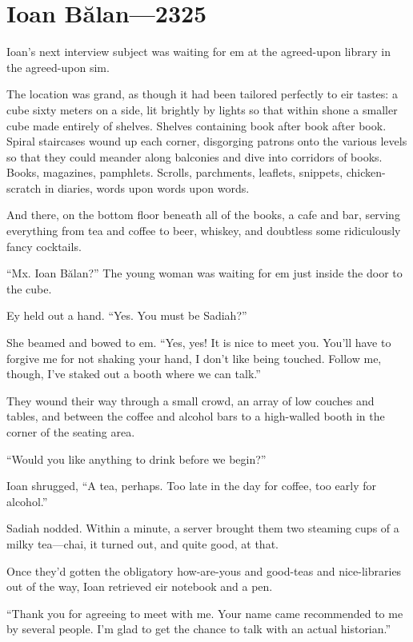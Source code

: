 \hypertarget{ioan-bux103lan-2325}{%
\chapter{Ioan Bălan---2325}\label{ioan-bux103lan-2325}}

Ioan's next interview subject was waiting for em at the agreed-upon library in the agreed-upon sim.

The location was grand, as though it had been tailored perfectly to eir tastes: a cube sixty meters on a side, lit brightly by lights so that within shone a smaller cube made entirely of shelves. Shelves containing book after book after book. Spiral staircases wound up each corner, disgorging patrons onto the various levels so that they could meander along balconies and dive into corridors of books. Books, magazines, pamphlets. Scrolls, parchments, leaflets, snippets, chicken-scratch in diaries, words upon words upon words.

And there, on the bottom floor beneath all of the books, a cafe and bar, serving everything from tea and coffee to beer, whiskey, and doubtless some ridiculously fancy cocktails.

``Mx. Ioan Bălan?'' The young woman was waiting for em just inside the door to the cube.

Ey held out a hand. ``Yes. You must be Sadiah?''

She beamed and bowed to em. ``Yes, yes! It is nice to meet you. You'll have to forgive me for not shaking your hand, I don't like being touched. Follow me, though, I've staked out a booth where we can talk.''

They wound their way through a small crowd, an array of low couches and tables, and between the coffee and alcohol bars to a high-walled booth in the corner of the seating area.

``Would you like anything to drink before we begin?''

Ioan shrugged, ``A tea, perhaps. Too late in the day for coffee, too early for alcohol.''

Sadiah nodded. Within a minute, a server brought them two steaming cups of a milky tea---chai, it turned out, and quite good, at that.

Once they'd gotten the obligatory how-are-yous and good-teas and nice-libraries out of the way, Ioan retrieved eir notebook and a pen.

``Thank you for agreeing to meet with me. Your name came recommended to me by several people. I'm glad to get the chance to talk with an actual historian.''


